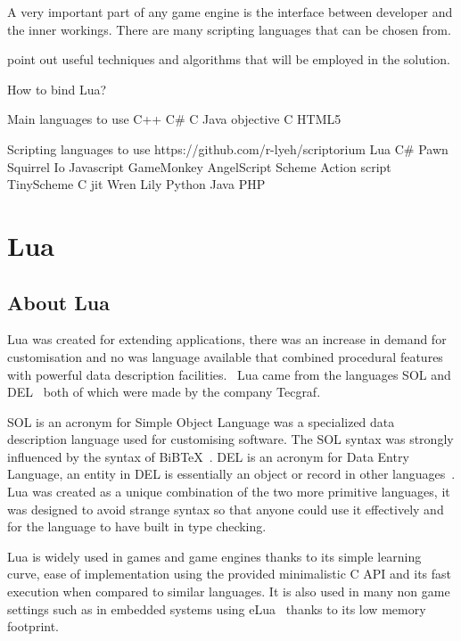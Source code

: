 \documentclass[11pt,a4paper,titlepage]{article}
\begin{document}
	A very important part of any game engine is the interface between developer and the inner workings. There are many scripting languages that can be chosen from.
	
	point out useful techniques and algorithms that will be employed in the solution. 
		
	How to bind Lua?
			

	\newpage

	Main languages to use
	C++
	C\#
	C
	Java
	objective C
	HTML5
	
	Scripting languages to use https://github.com/r-lyeh/scriptorium
		Lua
		C\# %
		Pawn
		Squirrel
		Io
		Javascript
		GameMonkey
		AngelScript
		Scheme
		Action script
		TinyScheme
		C jit
		Wren
		Lily
		Python
		Java
		PHP

	\newpage

\section{Lua}

\subsection{About Lua}
	Lua was created for extending applications, there was an increase in demand for customisation and no was language available that combined procedural features with powerful data description facilities.~\cite{Ierusalimschy02software} Lua came from the languages SOL and DEL~\cite{Ierusalimschy01theevolution} both of which were made by the company Tecgraf.
	
	SOL is an acronym for Simple Object Language was a specialized data description language used for customising software. The SOL syntax was strongly influenced by the syntax of BiBTeX~\cite{Lamport:1989:LDP:63364}. DEL is an acronym for Data Entry Language, an entity in DEL is essentially an object or record in other languages~\cite{Ierusalimschy01theevolution}. Lua was created as a unique combination of the two more primitive languages, it was designed to avoid strange syntax so that anyone could use it effectively and for the language to have built in type checking.
	
	Lua is widely used in games and game engines thanks to its simple learning curve, ease of implementation using the provided minimalistic C API and its fast execution when compared to similar languages. It is also used in many non game settings such as in embedded systems using eLua~\cite{eLua} thanks to its low memory footprint.
\end{document}
